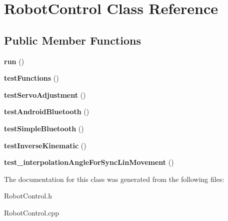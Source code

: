 \hypertarget{class_robot_control}{}\section{Robot\+Control Class Reference}
\label{class_robot_control}
\subsection*{Public Member Functions}
\begin{DoxyCompactItemize}
\item 
\mbox{\label{class_robot_control_af8dcc887d6a52fe6b94523c8b9ecf746}} 
{\bfseries run} ()
\item 
\mbox{\label{class_robot_control_a530d619e20fa880ba539d270b508487e}} 
{\bfseries test\+Functions} ()
\item 
\mbox{\label{class_robot_control_aa8cc8dacbf9f4e6b232668105ab15a19}} 
{\bfseries test\+Servo\+Adjustment} ()
\item 
\mbox{\label{class_robot_control_a4adabcdcfaccaa079c4a540c53e4daaa}} 
{\bfseries test\+Android\+Bluetooth} ()
\item 
\mbox{\label{class_robot_control_ad1ce8b08753ec13739406daf49d2135d}} 
{\bfseries test\+Simple\+Bluetooth} ()
\item 
\mbox{\label{class_robot_control_a66b5d4c35af5be7384bb45534007964e}} 
{\bfseries test\+Inverse\+Kinematic} ()
\item 
\mbox{\label{class_robot_control_a91851748b94bdc8680b146f9402bfde5}} 
{\bfseries test\+\_\+interpolation\+Angle\+For\+Sync\+Lin\+Movement} ()
\end{DoxyCompactItemize}


The documentation for this class was generated from the following files\+:\begin{DoxyCompactItemize}
\item 
Robot\+Control.\+h\item 
Robot\+Control.\+cpp\end{DoxyCompactItemize}

